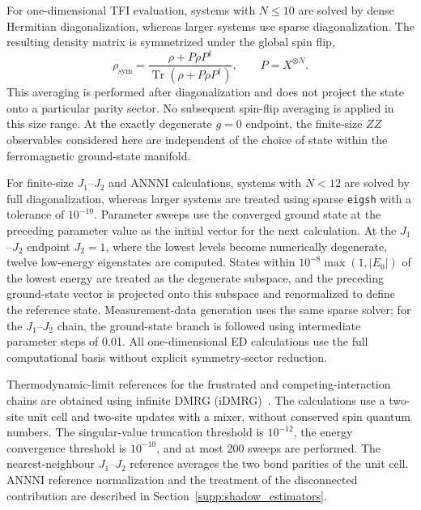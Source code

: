 \documentclass[11pt,a4paper]{article}
\newcommand{\TBD}[1]{\textcolor{red!70!black}{\textsf{[TBD: #1]}}}
\begin{document}
For one-dimensional TFI evaluation, systems with $N\leq10$ are solved
by dense Hermitian diagonalization, whereas larger systems use sparse diagonalization. The
resulting density matrix is symmetrized under the global spin flip,
\begin{equation}
\rho_{\mathrm{sym}}
=
\frac{\rho+P\rho P^\dagger}
{\operatorname{Tr}(\rho+P\rho P^\dagger)},
\qquad
P=X^{\otimes N}.
\end{equation}
This averaging is performed after diagonalization and does not
project the state onto a particular parity sector. No subsequent spin-flip
averaging is applied in this size range. At the exactly degenerate
$g=0$ endpoint, the finite-size $ZZ$ observables considered here are
independent of the choice of state within the ferromagnetic
ground-state manifold.

For finite-size $J_1$--$J_2$ and ANNNI calculations, systems with
$N<12$ are solved by full diagonalization, whereas larger systems are
treated using sparse \texttt{eigsh} with a tolerance of $10^{-10}$.
Parameter sweeps use the converged ground state at the preceding
parameter value as the initial vector for the next calculation. At
the $J_1$--$J_2$ endpoint $J_2=1$, where the lowest levels become
numerically degenerate, twelve low-energy eigenstates are computed.
States within $10^{-8}\max(1,|E_0|)$ of the lowest energy are treated
as the degenerate subspace, and the preceding ground-state vector is
projected onto this subspace and renormalized to define the reference
state. Measurement-data generation uses the same sparse solver; for
the $J_1$--$J_2$ chain, the ground-state branch is followed using
intermediate parameter steps of 0.01. All one-dimensional ED
calculations use the full computational basis without explicit
symmetry-sector reduction.

Thermodynamic-limit references for the frustrated and
competing-interaction chains are obtained using infinite DMRG
(iDMRG)~\cite{mcculloch2008infinite,schollwock2011density}. The calculations
use a two-site unit cell and two-site updates with a mixer, without
conserved spin quantum numbers. The singular-value truncation
threshold is $10^{-12}$, the energy convergence threshold is
$10^{-10}$, and at most 200 sweeps are performed.
The nearest-neighbour $J_1$--$J_2$ reference averages the two bond
parities of the unit cell. ANNNI reference normalization and the
treatment of the disconnected contribution are described in
Section~\ref{supp:shadow_estimators}.
\end{document}
